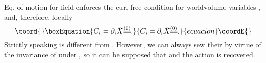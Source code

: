 \documentclass[a4paper,11pt]{article}
\begin{document}
Eq. of motion for \coordHE{} field enforces the curl free
condition for worldvolume variables \coordHE{}, and, therefore, locally
\begin{equation}\coord{}\boxEquation{\plabel{A}
C_i=\partial_i {\tilde X}^{\underline{(0)}}.
}{C_i=\partial_i {\tilde X}^{\underline{(0)}}.
}{ecuacion}\coordE{}\end{equation}
Strictly speaking \coordHE{} is different from
\coordHE{}. However, we can always sew their by virtue of the
invariance of  under \coordHE{}, so it can be supposed that \coordHE{}
and the action  is recovered.
\end{document}
